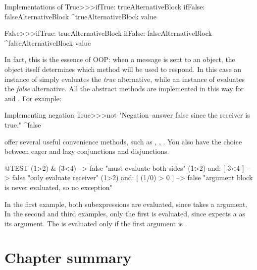 \documentclass[a4paper,10pt,twoside]{book}
\begin{document}
\begin{method}{Implementations of }
True>>>ifTrue: trueAlternativeBlock ifFalse: falseAlternativeBlock 
    ^trueAlternativeBlock value

False>>>ifTrue: trueAlternativeBlock ifFalse: falseAlternativeBlock 
    ^falseAlternativeBlock value
\end{method}

In fact, this is the essence of OOP: when a message is sent to an object, the object itself determines which method will be used to respond. In this case an instance of  simply evaluates the \emph{true} alternative, while an instance of  evaluates the \emph{false} alternative.  All the abstract  methods are implemented in this way for  and . For example:

\begin{method}{Implementing negation}
True>>>not
    "Negation--answer false since the receiver is true."
    ^false
\end{method}

 offer several useful convenience methods, such as , , . You also have the choice between eager and lazy conjunctions and disjunctions.

\begin{code}{@TEST}
(1>2) & (3<4)              --> false    "must evaluate both sides"
(1>2) and: [ 3<4 ]        --> false    "only evaluate receiver"
(1>2) and: [ (1/0) > 0 ] --> false    "argument block is never evaluated, so no exception"
\end{code}

In the first example, both  subexpressions are evaluated, since  takes a  argument.
In the second and third examples, only the first is evaluated, since  expects a  as its argument.  The  is evaluated only if the first argument is .


\section{Chapter summary}
\end{document}
